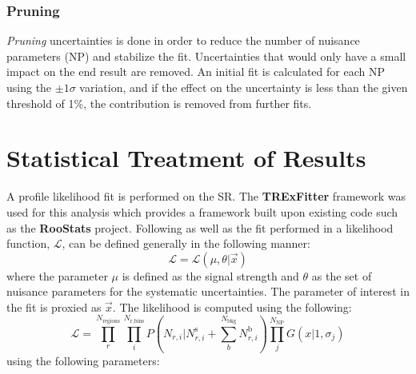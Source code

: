 \subsubsection{Pruning}
\label{sec:Pruning}
\textit{Pruning} uncertainties is done in order to reduce the number of nuisance parameters (NP) and stabilize the fit.  Uncertainties that would only have a small impact on the end result are removed.  An initial fit is calculated for each NP using the $\pm 1 \sigma$ variation, and if the effect on the uncertainty is less than the given threshold of 1\%, the contribution is removed from further fits. %

\section{Statistical Treatment of Results}
\label{sec:StatTreatment}
A profile likelihood fit is performed on the SR.  The \textbf{TRExFitter} framework \cite{TRExFitter} was used for this analysis which provides a framework built upon existing code such as the \textbf{RooStats} project\cite{Moneta:2010pm}.
Following \cite{Lista:2016chp} as well as the fit performed in \cite{GregorFCNC} a likelihood function, $\mathcal{L}$, can be defined generally in the following manner:
\[ \mathcal{L} = \mathcal{L}(\mu,\theta|\overrightarrow{x})
\]
where the parameter $\mu$ is defined as the signal strength and $\theta$ as the set of nuisance parameters for the systematic uncertainties.  The parameter of interest in the fit is proxied as  $\overrightarrow{x}$.  The likelihood is computed using the following:
\[ \mathcal{L} = \displaystyle\prod_{r}^{N_\text{regions}}  \displaystyle\prod_{i}^{N_\text{r,bins}} P(N_{r,i}|N_{r,i}^\text{s} + \displaystyle\sum_{b}^{N_\text{bkg}}N_{r,i}^\text{b}) \displaystyle\prod_{j}^{N_\text{NP}} G(x|1,\sigma_{j})
\]
using the following parameters:
